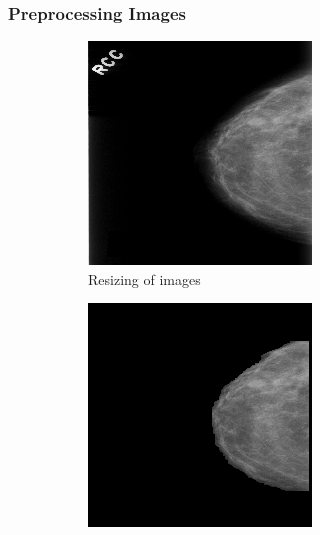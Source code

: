 \documentclass[sn-mathphys,Numbered]{sn-jnl}%
\theoremstyle{thmstyleone}%
\theoremstyle{thmstyletwo}%
\theoremstyle{thmstylethree}%
\begin{document}
\subsubsection{Preprocessing Images}
\label{Preprocessing}
\begin{figure}[ht]
  \centering
  \begin{subfigure}{0.22\textwidth}
    \centering
    \includegraphics[width=\linewidth]{resized.png}
    \caption{Resizing of images}
  \end{subfigure}%
  \hfill
  \begin{subfigure}{0.22\textwidth}
    \centering
    \includegraphics[width=\linewidth]{artefacts_removed.png}

\end{subfigure}
\end{figure}
\end{document}
